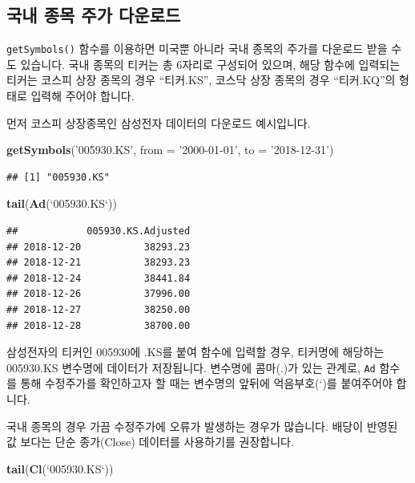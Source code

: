 \documentclass[]{book}
\newenvironment{Shaded}{\begin{snugshade}}{\end{snugshade}}
\newcommand{\DataTypeTok}[1]{\textcolor[rgb]{0.13,0.29,0.53}{#1}}
\newcommand{\KeywordTok}[1]{\textcolor[rgb]{0.13,0.29,0.53}{\textbf{#1}}}
\newcommand{\NormalTok}[1]{#1}
\newcommand{\StringTok}[1]{\textcolor[rgb]{0.31,0.60,0.02}{#1}}
\begin{document}
\hypertarget{section-11}{%
\subsection{국내 종목 주가 다운로드}\label{section-11}}

\texttt{getSymbols()} 함수를 이용하면 미국뿐 아니라 국내 종목의 주가를 다운로드 받을 수도 있습니다. 국내 종목의 티커는 총 6자리로 구성되어 있으며, 해당 함수에 입력되는 티커는 코스피 상장 종목의 경우 ``티커.KS'', 코스닥 상장 종목의 경우 ``티커.KQ''의 형태로 입력해 주어야 합니다.

먼저 코스피 상장종목인 삼성전자 데이터의 다운로드 예시입니다.

\begin{Shaded}
\begin{Highlighting}[]
\KeywordTok{getSymbols}\NormalTok{(}\StringTok{'005930.KS'}\NormalTok{, }\DataTypeTok{from =} \StringTok{'2000-01-01'}\NormalTok{, }\DataTypeTok{to =} \StringTok{'2018-12-31'}\NormalTok{)}
\end{Highlighting}
\end{Shaded}

\begin{verbatim}
## [1] "005930.KS"
\end{verbatim}

\begin{Shaded}
\begin{Highlighting}[]
\KeywordTok{tail}\NormalTok{(}\KeywordTok{Ad}\NormalTok{(}\StringTok{`}\DataTypeTok{005930.KS}\StringTok{`}\NormalTok{))}
\end{Highlighting}
\end{Shaded}

\begin{verbatim}
##            005930.KS.Adjusted
## 2018-12-20           38293.23
## 2018-12-21           38293.23
## 2018-12-24           38441.84
## 2018-12-26           37996.00
## 2018-12-27           38250.00
## 2018-12-28           38700.00
\end{verbatim}

삼성전자의 티커인 005930에 .KS를 붙여 함수에 입력할 경우, 티커명에 해당하는 005930.KS 변수명에 데이터가 저장됩니다. 변수명에 콤마(.)가 있는 관계로, \texttt{Ad} 함수를 통해 수정주가를 확인하고자 할 때는 변수명의 앞뒤에 억음부호(`)를 붙여주어야 합니다.

국내 종목의 경우 가끔 수정주가에 오류가 발생하는 경우가 많습니다. 배당이 반영된 값 보다는 단순 종가(Close) 데이터를 사용하기를 권장합니다.

\begin{Shaded}
\begin{Highlighting}[]
\KeywordTok{tail}\NormalTok{(}\KeywordTok{Cl}\NormalTok{(}\StringTok{`}\DataTypeTok{005930.KS}\StringTok{`}\NormalTok{))}
\end{Highlighting}
\end{Shaded}
\end{document}
